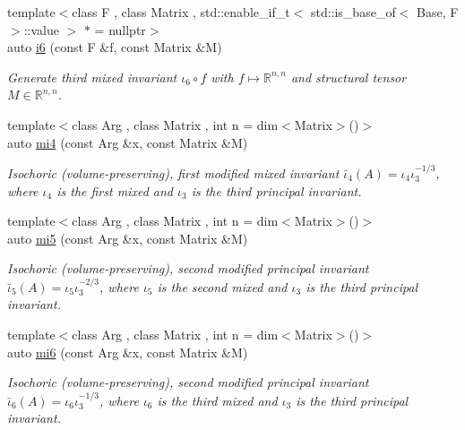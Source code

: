 \begin{DoxyCompactItemize}
{\footnotesize template$<$class F , class Matrix , std\+::enable\+\_\+if\+\_\+t$<$ std\+::is\+\_\+base\+\_\+of$<$ Base, F $>$\+::value $>$ $\ast$  = nullptr$>$ }\\auto \hyperlink{group__InvariantGroup_ga2536c80df733bb3e089487202c3688c1}{i6} (const F \&f, const Matrix \&M)
\begin{DoxyCompactList}\small\item\em Generate third mixed invariant $ \iota_6\circ f $ with $f\mapsto\mathbb{R}^{n,n}$ and structural tensor $M\in\mathbb{R}^{n,n}$. \end{DoxyCompactList}\item 
{\footnotesize template$<$class Arg , class Matrix , int n = dim$<$\+Matrix$>$()$>$ }\\auto \hyperlink{group__InvariantGroup_ga7ee54c5d056877bdefefb8e54ad17791}{mi4} (const Arg \&x, const Matrix \&M)
\begin{DoxyCompactList}\small\item\em Isochoric (volume-\/preserving), first modified mixed invariant $ \bar\iota_4(A)=\iota_4\iota_3^{-1/3} $, where $\iota_4$ is the first mixed and $\iota_3$ is the third principal invariant. \end{DoxyCompactList}\item 
{\footnotesize template$<$class Arg , class Matrix , int n = dim$<$\+Matrix$>$()$>$ }\\auto \hyperlink{group__InvariantGroup_ga189bc682b34d13902da335c5eb502faa}{mi5} (const Arg \&x, const Matrix \&M)
\begin{DoxyCompactList}\small\item\em Isochoric (volume-\/preserving), second modified principal invariant $ \bar\iota_5(A)=\iota_5\iota_3^{-2/3} $, where $\iota_5$ is the second mixed and $\iota_3$ is the third principal invariant. \end{DoxyCompactList}\item 
{\footnotesize template$<$class Arg , class Matrix , int n = dim$<$\+Matrix$>$()$>$ }\\auto \hyperlink{group__InvariantGroup_ga3e451f9e15fa95080f81d0c0f69f93e6}{mi6} (const Arg \&x, const Matrix \&M)
\begin{DoxyCompactList}\small\item\em Isochoric (volume-\/preserving), second modified principal invariant $ \bar\iota_6(A)=\iota_6\iota_3^{-1/3} $, where $\iota_6$ is the third mixed and $\iota_3$ is the third principal invariant. \end{DoxyCompactList}\item 

\end{DoxyCompactItemize}
